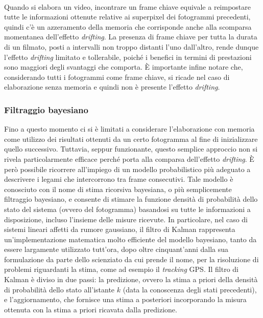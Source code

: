 \documentclass[12pt,a4paper,oneside]{article}
\begin{document}
\\Quando si elabora un video, incontrare un frame chiave equivale a reimpostare tutte le informazioni ottenute relative ai superpixel dei fotogrammi precedenti, quindi c'è un azzeramento della memoria che corrisponde anche alla scomparsa momentanea dell'effetto \textit{drifting}. La presenza di frame chiave per tutta la durata di un filmato, posti a intervalli non troppo distanti l'uno dall'altro, rende dunque l'effetto \textit{drifting} limitato e tollerabile, poiché i benefici in termini di prestazioni sono maggiori degli svantaggi che comporta. È importante infine notare che, considerando tutti i fotogrammi come frame chiave, si ricade nel caso di elaborazione senza memoria e quindi non è presente l'effetto \textit{drifting}.

\subsubsection{Filtraggio bayesiano}
Fino a questo momento ci si è limitati a considerare l'elaborazione con memoria come utilizzo dei risultati ottenuti da un certo fotogramma al fine di inizializzare quello successivo. Tuttavia, seppur funzionante, questo semplice approccio non si rivela particolarmente efficace perché porta alla comparsa dell'effetto \textit{drifting}. È però possibile ricorrere all'impiego di un modello probabilistico più adeguato a descrivere i legami che intercorrono tra frame consecutivi. Tale modello è conosciuto con il nome di stima ricorsiva bayesiana, o più semplicemente filtraggio bayesiano, e consente di stimare la funzione densità di probabilità dello stato del sistema (ovvero del fotogramma) basandosi su tutte le informazioni a disposizione, incluso l'insieme delle misure ricevute. In particolare, nel caso di sistemi lineari affetti da rumore gaussiano, il filtro di Kalman rappresenta un'implementazione matematica molto efficiente del modello bayesiano, tanto da essere largamente utilizzato tutt'ora, dopo oltre cinquant'anni dalla sua formulazione da parte dello scienziato da cui prende il nome, per la risoluzione di problemi riguardanti la stima, come ad esempio il \textit{tracking} GPS. Il filtro di Kalman è diviso in due passi: la predizione, ovvero la stima a priori della densità di probabilità dello stato all'istante $k$ (data la conoscenza degli stati precedenti), e l'aggiornamento, che fornisce una stima a posteriori incorporando la misura ottenuta con la stima a priori ricavata dalla predizione.
\end{document}
